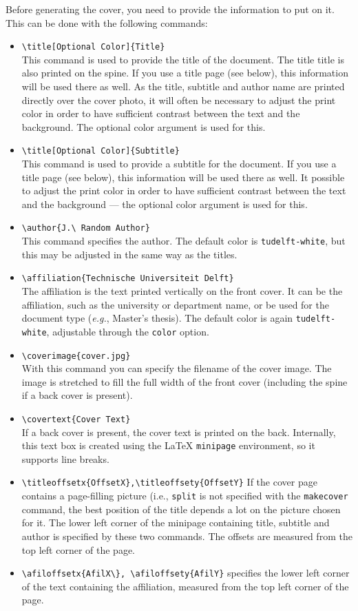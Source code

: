 Before generating the cover, you need to provide the information to put on it. This can be done with the following commands:
\begin{itemize}
    \item\verb|\title[Optional Color]{Title}| \\
    This command is used to provide the title of the document. The title
    title is also printed on the spine. If you use a title page (see below), this information will be used there as well.
    As the title, subtitle and author name are printed directly over the cover photo, it will often be necessary to adjust the print color in order to have
    sufficient contrast between the text and the background. The optional color argument is used for this.
    \item\verb|\title[Optional Color]{Subtitle}| \\
    This command is used to provide a subtitle for the document. If you use a title page (see below), this information will be used there as well.
    It possible to adjust the print color in order to have
    sufficient contrast between the text and the background --- the optional color argument is used for this.
    \item\verb|\author{J.\ Random Author}| \\
    This command specifies the author. The default color is \texttt{tudelft-white}, but this may be adjusted in the same way as the titles.
    \item\verb|\affiliation{Technische Universiteit Delft}| \\
    The affiliation is the text printed vertically on the front cover. It can be the affiliation, such as the university or department name, or be used for the document type (\emph{e.g.}, Master's thesis). The default color is again \texttt{tudelft-white}, adjustable through the \texttt{color} option.
    \item\verb|\coverimage{cover.jpg}| \\
    With this command you can specify the filename of the cover image. The image is stretched to fill the full width of the front cover (including the spine if a back cover is present).
    \item\verb|\covertext{Cover Text}| \\
    If a back cover is present, the cover text is printed on the back. Internally, this text box is created using the \LaTeX{} \texttt{minipage} environment, so it supports line breaks.
    \item\verb|\titleoffsetx{OffsetX},\titleoffsety{OffsetY}|
    If the cover page contains a page-filling picture (i.e., \texttt{split} is not specified with the \texttt{makecover} command, the best position of the title depends a lot on the picture chosen for it. The lower left corner of the minipage containing title, subtitle and author is
    specified by these two commands. The offsets are measured from the top left corner of the page.
    \item\verb|\afiloffsetx{AfilX\}, \afiloffsety{AfilY}|
    specifies the lower left corner of the text containing the affiliation, measured from the top left corner of the page.
\end{itemize}


